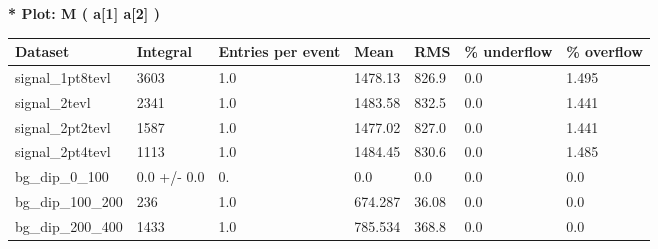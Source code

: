 \documentclass[a4paper, 10pt]{article}
\begin{document}
\textbf{* Plot: M ( a[1] a[2] ) }\\
   \begin{table}[H]
  \begin{center}
    \begin{tabular}{|m{23.0mm}|m{23.0mm}|m{18.0mm}|m{19.0mm}|m{19.0mm}|m{19.0mm}|m{19.0mm}|}
      \hline
      {\cellcolor{yellow}         Dataset}& {\cellcolor{yellow}         Integral}& {\cellcolor{yellow}         Entries per event}& {\cellcolor{yellow}         Mean}& {\cellcolor{yellow}         RMS}& {\cellcolor{yellow}         \% underflow}& {\cellcolor{yellow}         \% overflow}\\
      \hline
      {\cellcolor{white}         signal\_1pt8tevl}& {\cellcolor{white}         3603}& {\cellcolor{white}         1.0}& {\cellcolor{white}         1478.13}& {\cellcolor{white}         826.9}& {\cellcolor{green}         0.0}& {\cellcolor{green}         1.495}\\
      \hline
      {\cellcolor{white}         signal\_2tevl}& {\cellcolor{white}         2341}& {\cellcolor{white}         1.0}& {\cellcolor{white}         1483.58}& {\cellcolor{white}         832.5}& {\cellcolor{green}         0.0}& {\cellcolor{green}         1.441}\\
      \hline
      {\cellcolor{white}         signal\_2pt2tevl}& {\cellcolor{white}         1587}& {\cellcolor{white}         1.0}& {\cellcolor{white}         1477.02}& {\cellcolor{white}         827.0}& {\cellcolor{green}         0.0}& {\cellcolor{green}         1.441}\\
      \hline
      {\cellcolor{white}         signal\_2pt4tevl}& {\cellcolor{white}         1113}& {\cellcolor{white}         1.0}& {\cellcolor{white}         1484.45}& {\cellcolor{white}         830.6}& {\cellcolor{green}         0.0}& {\cellcolor{green}         1.485}\\
      \hline
      {\cellcolor{white}         bg\_dip\_0\_100}& {\cellcolor{white}         0.0 +/\-- 0.0}& {\cellcolor{white}         0.}& {\cellcolor{white}         0.0}& {\cellcolor{white}         0.0}& {\cellcolor{green}         0.0}& {\cellcolor{green}         0.0}\\
      \hline
      {\cellcolor{white}         bg\_dip\_100\_200}& {\cellcolor{white}         236}& {\cellcolor{white}         1.0}& {\cellcolor{white}         674.287}& {\cellcolor{white}         36.08}& {\cellcolor{green}         0.0}& {\cellcolor{green}         0.0}\\
      \hline
      {\cellcolor{white}         bg\_dip\_200\_400}& {\cellcolor{white}         1433}& {\cellcolor{white}         1.0}& {\cellcolor{white}         785.534}& {\cellcolor{white}         368.8}& {\cellcolor{green}         0.0}& {\cellcolor{green}         0.0}\\

\end{tabular}
\end{center}
\end{table}
\end{document}
